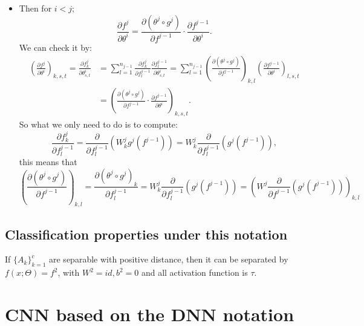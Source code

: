 \begin{itemize}
	\item Then for $i < j$; 
	\begin{equation}
	\frac{\partial f^j}{\partial \theta^i}  
	=  \frac{\partial (\theta^{j}\circ g^j)}{\partial f^{j-1}} \cdot \frac{\partial f^{j-1}}{\partial \theta^i}.
	\end{equation}
	We can check it by:
	\begin{align}
		\left(\frac{\partial f^j}{\partial \theta^i} \right)_{k,s,t} 
		= \frac{\partial f^j_k}{\partial \theta^i_{s,t}} &=
		\sum_{l = 1}^{n_{j-1}} \frac{\partial f^{j}_k}{\partial f^{j-1}_l} \frac{\partial f^{j-1}_l}{\partial \theta^i_{s,t}}  =
		\sum_{l = 1}^{n_{j-1}} \left( \frac{\partial (\theta^{j}\circ
			g^j)}{\partial f^{j-1}}\right)_{k,l} \left(\frac{\partial
			f^{j-1}}{\partial \theta^i}\right)_{l,s,t} \\  &=  
		\left(\frac{\partial  (\theta^{j}\circ g^j)}{\partial f^{j-1}} \cdot \frac{\partial f^{j-1}}{\partial \theta^i} \right)_{k,s,t}.
	\end{align}
	So what we only need to do is to compute:
	\begin{equation}
	\frac{\partial f^{j}_k}{\partial f^{j-1}_l} =\frac{ \partial}{\partial f^{j-1}_l}\left( W^j_{k} g^{j}(f^{j-1}) \right) = W^j_{k} \frac{ \partial }{\partial f^{j-1}_l}\left(g^{j}(f^{j-1})\right),
	\end{equation}
	this means that 
	\begin{equation}
	\left(\frac{\partial  (\theta^{j}\circ g^j)}{\partial
		f^{j-1}}\right)_{k,l} 
	= \frac{\partial  (\theta^{j}\circ g^j)_k}{\partial f^{j-1}_l}  = W^j_{k} \frac{ \partial}{\partial f^{j-1}_l} \left( g^{j}(f^{j-1})\right)= \left(W^j \frac{\partial }{\partial f^{j-1}}\left(g^{j}(f^{j-1})\right)\right)_{k,l}
	\end{equation}
\end{itemize}

\subsection{Classification properties under this notation}
\begin{theorem}
	If $\{A_k\}_{k=1}^c$ are separable with positive distance, then it
	can be separated by $f(x; \Theta) = f^2$, with $W^2= id, b^2=0$ and
	all activation function is $\tau$.
\end{theorem}

\section{CNN based on the DNN notation}
